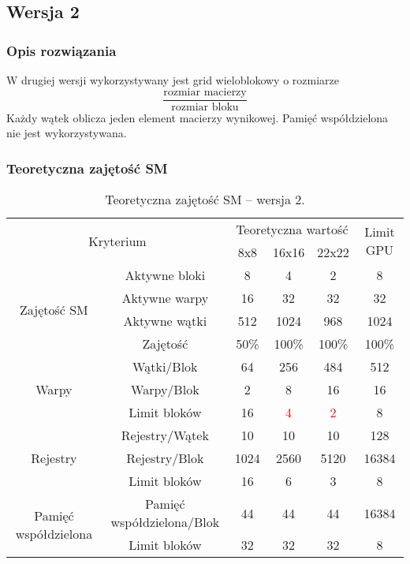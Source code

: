 
\subsection{Wersja 2}

\subsubsection{Opis rozwiązania}

W drugiej wersji wykorzystywany jest grid wieloblokowy o rozmiarze $$ \frac{\text{rozmiar macierzy}}{\text{rozmiar bloku}} $$
Każdy wątek oblicza jeden element macierzy wynikowej. Pamięć współdzielona nie jest wykorzystywana.



\subsubsection{Teoretyczna zajętość SM}

\begin{center}
\begin{table}[H]
\centering
\begin{tabular}{|c|c|c|c|c|c|}
\hline
\multicolumn{2}{|c|}{\multirow{2}{*}{Kryterium}} & \multicolumn{3}{c|}{Teoretyczna wartość} & \multirow{2}{*}{Limit GPU} \\ \cline{3-5}
\multicolumn{2}{|c|}{} & 8x8 & 16x16 & 22x22 & \\ \hline
\multirow{4}{*}{Zajętość SM} & Aktywne bloki & 8 & 4 & 2 & 8 \\ \cline{2-6}
& Aktywne warpy & 16 & 32 & 32 & 32 \\ \cline{2-6}
& Aktywne wątki & 512 & 1024 & 968 & 1024 \\ \cline{2-6}
& Zajętość & 50\% & 100\% & 100\% & 100\% \\ \hline
\multirow{3}{*}{Warpy} & Wątki/Blok & 64 & 256 & 484 & 512 \\ \cline{2-6}
& Warpy/Blok & 2 & 8 & 16 & 16 \\ \cline{2-6}
& Limit bloków & 16 & \textcolor{red}{4} & \textcolor{red}{2} & 8 \\ \hline
\multirow{3}{*}{Rejestry} & Rejestry/Wątek & 10 & 10 & 10 & 128 \\ \cline{2-6}
& Rejestry/Blok & 1024 & 2560 & 5120 & 16384 \\ \cline{2-6}
& Limit bloków & 16 & 6 & 3 & 8 \\ \hline
\multirow{2}{*}{Pamięć współdzielona} & Pamięć współdzielona/Blok & 44 & 44 & 44 & 16384 \\ \cline{2-6}
& Limit bloków & 32 & 32 & 32 & 8 \\ \hline
\end{tabular}
\caption{Teoretyczna zajętość SM -- wersja 2.}
\end{table}
\end{center}

